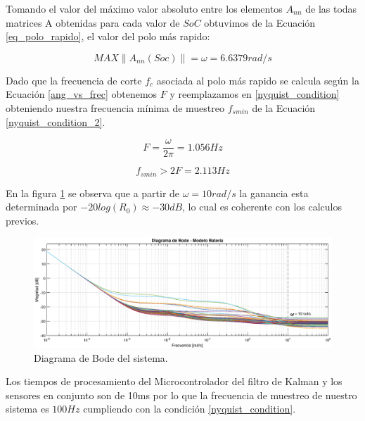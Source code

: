 \documentclass[10pt, a4paper]{article}
\begin{document}
Tomando el valor del máximo valor absoluto entre los elementos $A_{nn}$ de las
todas matrices A obtenidas para cada valor de $SoC$ obtuvimos de la Ecuación
\ref{eq_polo_rapido}, el valor del polo más rapido:

     \begin{equation}
     	MAX  \left \|A_{nn}(Soc)\right \| = \omega = 6.6379 rad/s
     	\label{eq_polo_rapido}
     \end{equation}

Dado que la frecuencia de corte $f_c$ asociada al polo más rapido se calcula
según la Ecuación \ref{ang_vs_frec} obtenemos $F$ y reemplazamos en
\ref{nyquist_condition} obteniendo nuestra frecuencia mínima de muestreo
$f_{smin}$ de la Ecuación \ref{nyquist_condition_2}.

\begin{equation}
	F = \frac{\omega}{2 \pi} = 1.056 Hz
	\label{ang_vs_frec}
\end{equation}

\begin{equation}
	f_{s min} > 2 F = 2.113 Hz
	\label{nyquist_condition_2}
\end{equation}

En la figura \ref{system_bode} se observa que a partir de $\omega = 10 rad/s$ la
ganancia esta determinada por $-20log(R_{0})\approx-30dB$, lo cual es coherente
con los calculos previos.

\begin{figure}[h!]
	\begin{center}
		\includegraphics[width=1\textwidth]{bode_amplitud_w_grid.eps}
		\caption{Diagrama de Bode del sistema.}
		\label{system_bode}
	\end{center}
\end{figure}
\FloatBarrier

Los tiempos de procesamiento del Microcontrolador del filtro de Kalman y los
sensores en conjunto son de 10ms por lo que la frecuencia de muestreo de nuestro
sistema es $100 Hz$ cumpliendo con la condición \ref{nyquist_condition}.
\end{document}
